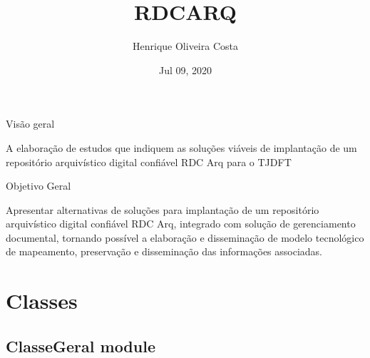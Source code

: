 \documentclass[letterpaper,10pt,english]{sphinxmanual}
\title{RDC\sphinxhyphen{}ARQ}
\date{Jul 09, 2020}
\author{Henrique Oliveira Costa}
\begin{document}
\pagestyle{empty}
\sphinxmaketitle
\pagestyle{plain}
\sphinxtableofcontents
\pagestyle{normal}
\label{\detokenize{index::doc}}


Visão geral

A elaboração de estudos que indiquem as soluções viáveis de implantação de um repositório arquivístico digital confiável \sphinxhyphen{} RDC \sphinxhyphen{} Arq para o TJDFT

Objetivo Geral

Apresentar alternativas de soluções para implantação de um repositório arquivístico digital confiável \sphinxhyphen{} RDC \sphinxhyphen{} Arq, integrado com solução de gerenciamento documental, tornando possível a elaboração e disseminação de modelo tecnológico de mapeamento, preservação e disseminação das informações associadas.


\chapter{Classes}
\label{\detokenize{modules:classes}}\label{\detokenize{modules::doc}}

\section{ClasseGeral module}
\label{\detokenize{ClasseGeral:module-ClasseGeral}}\label{\detokenize{ClasseGeral:classegeral-module}}\label{\detokenize{ClasseGeral::doc}}
\end{document}

